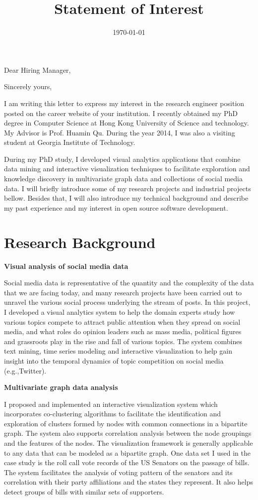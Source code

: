 \documentclass[11pt,a4paper,sans]{moderncv} %
\title{Statement of Interest}
\begin{document}
\date{\today} %
\opening{Dear Hiring Manager,} %
\closing{Sincerely yours,} %
\makelettertitle %

I am writing this letter to express my interest in the research engineer position posted on the career website of your institution. I recently obtained my PhD degree in Computer Science at Hong Kong University of Science and technology. My Advisor is Prof. Huamin Qu. During the year 2014, I was also a visiting student at Georgia Institute of Technology.

During my PhD study, I developed visual analytics applications that combine data mining and interactive visualization techniques to facilitate exploration and knowledge discovery in multivariate graph data and collections of social media data. I will briefly introduce some of my research projects and industrial projects bellow. Besides that, I will also introduce my technical background and describe my past experience and my interest in open source software development. 

\section{Research Background}

\textbf{Visual analysis of social media data}

Social media data is representative of the quantity and the complexity of the data that we are facing today, and many research projects have been carried out to unravel the various social process underlying the stream of posts. In this project, I developed a visual analytics system to help the domain experts study how various topics compete to attract public attention when they spread on social media, and what roles do opinion leaders such as mass media, political figures and grassroots play in the rise and fall of various topics. The system combines text mining, time series modeling and interactive visualization to help gain insight into the temporal dynamics of topic competition on social media (e.g.,Twitter).

\textbf{Multivariate graph data analysis}

I proposed and implemented an interactive visualization system which incorporates co-clustering algorithms to facilitate the identification and exploration of clusters formed by nodes with common connections in a bipartite graph. The system also supports correlation analysis between the node groupings and the features of the nodes. The visualization framework is generally applicable to any data that can be modeled as a bipartite graph. One data set I used in the case study is the roll call vote records of the US Senators on the passage of bills. The system facilitates the analysis of voting pattern of the senators and its correlation with their party affiliations and the states they represent. It also helps detect groups of bills with similar sets of supporters.
\end{document}
